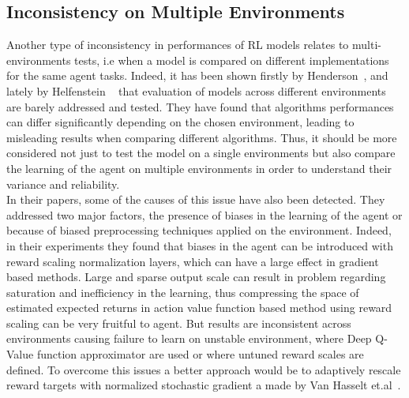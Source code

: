 \documentclass{article}
\begin{document}
\subsection{Inconsistency on Multiple Environments}
Another type of inconsistency in performances of RL models relates to multi-environments tests, i.e when a model is compared on different implementations for the same agent tasks. Indeed, it has been shown firstly by Henderson~\cite{DRL01}, and lately by Helfenstein ~\cite{BenchmarkingDRL} that evaluation of models across different environments are barely addressed and tested. 
They have found that algorithms performances can differ significantly depending on the chosen environment, leading to misleading results when comparing different algorithms. Thus, it should be more considered not just to test the model on a single environments but also compare the learning of the agent on multiple environments in order to understand their variance and reliability.\\
In their papers, some of the causes of this issue have also been detected. They addressed two major factors, the presence of biases in the learning of the agent or because of biased preprocessing techniques applied on the environment. Indeed, in their experiments they found that biases in the agent can be introduced with reward scaling normalization layers, which can have a large effect in gradient based methods. Large and sparse output scale can result in problem regarding saturation and inefficiency in the learning, thus compressing the space of estimated expected returns in action value function based method using reward scaling can be very fruitful to agent. But results are inconsistent across environments causing failure to learn on unstable environment, where Deep Q-Value function approximator are used or where untuned reward scales are defined. To overcome this issues a better approach would be to adaptively rescale reward targets with normalized stochastic gradient a made by Van Hasselt et.al~\cite{VaHasselt}.
\end{document}
